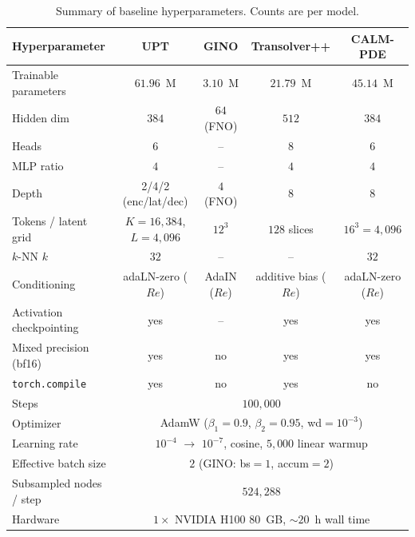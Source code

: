 \documentclass{article}
\begin{document}
\begin{table}[t]                           
      \centering                                         
      \caption{Summary of baseline hyperparameters. Counts are per model.}   
      \label{tab:baseline_hparams}
      \small                      
      \setlength{\tabcolsep}{4pt}                        
      \begin{tabular*}{\linewidth}{@{\extracolsep{\fill}}lcccc@{}}   
          \toprule 
          Hyperparameter & UPT & GINO & Transolver++ & CALM-PDE \\   
          \midrule      
          Trainable parameters & $61.96$~M & $3.10$~M & $21.79$~M & $45.14$~M \\    
          Hidden dim & $384$  & $64$ (FNO) & $512$  & $384$ \\   
          Heads & $6$    & -- & $8$    & $6$   \\   
          MLP ratio & $4$    & -- & $4$    & $4$   \\    
          Depth & 2/4/2 (enc/lat/dec) & $4$ (FNO) & $8$ & $8$ \\     
          Tokens / latent grid & $K{=}16{,}384$, $L{=}4{,}096$ & $12^3$ & $128$ slices & $16^3{=}4{,}096$ \\         
          $k$-NN $k$ & $32$   & -- & --     & $32$  \\       
          Conditioning & adaLN-zero ($Re$) & AdaIN ($Re$) & additive bias ($Re$) & adaLN-zero ($Re$) \\ 
          Activation checkpointing & yes    & --  & yes    & yes \\ 
          Mixed precision (bf16) & yes & no   & yes    & yes   \\   
          \texttt{torch.compile} & yes & no & yes    & no    \\      
          Steps & \multicolumn{4}{c}{$100{,}000$} \\     
          Optimizer & \multicolumn{4}{c}{AdamW ($\beta_1{=}0.9$, $\beta_2{=}0.95$, wd${=}10^{-3}$)} \\ 
          Learning rate & \multicolumn{4}{c}{$10^{-4}$ $\rightarrow$ $10^{-7}$, cosine, $5{,}000$ linear warmup} \\            
          Effective batch size & \multicolumn{4}{c}{$2$ (GINO: bs${=}1$, accum${=}2$)} \\ 
          Subsampled nodes / step&\multicolumn{4}{c}{$524{,}288$} \\ 
          Hardware & \multicolumn{4}{c}{$1{\times}$ NVIDIA H100 80~GB, ${\sim}20$~h wall time} \\ 
          \bottomrule  
      \end{tabular*} 
  \end{table}         


\newpage
%
\end{document}
